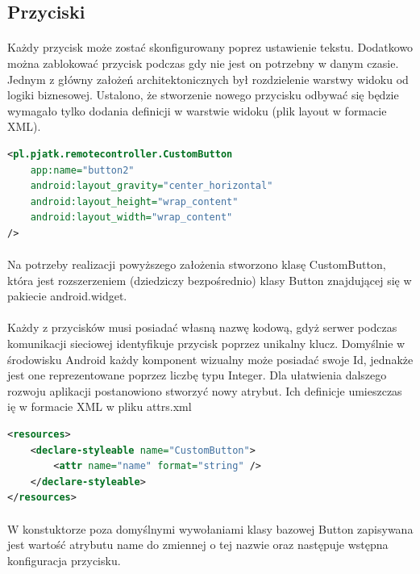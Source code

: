 \subsection{Przyciski}
\paragraph{}
Każdy przycisk może zostać skonfigurowany poprez ustawienie tekstu. Dodatkowo można zablokować przycisk podczas gdy nie jest on potrzebny w danym czasie. 
Jednym z główny założeń architektonicznych był rozdzielenie warstwy widoku od logiki biznesowej. Ustalono, że stworzenie nowego przycisku odbywać się będzie wymagało tylko dodania definicji w warstwie widoku (plik layout w formacie XML).

\begin{lstlisting}[language=XML]
<pl.pjatk.remotecontroller.CustomButton
    app:name="button2"
    android:layout_gravity="center_horizontal"
    android:layout_height="wrap_content"
    android:layout_width="wrap_content"
/>
\end{lstlisting}
\paragraph{}
Na potrzeby realizacji powyższego założenia stworzono klasę CustomButton, która jest rozszerzeniem (dziedziczy bezpośrednio) klasy Button znajdującej się w pakiecie  android.widget.
\paragraph{}
Każdy z przycisków musi posiadać własną nazwę kodową, gdyż serwer podczas komunikacji sieciowej identyfikuje przycisk poprzez unikalny klucz. Domyślnie w środowisku Android każdy komponent wizualny może posiadać swoje Id, jednakże jest one reprezentowane poprzez liczbę typu Integer.
Dla ułatwienia dalszego rozwoju aplikacji postanowiono stworzyć nowy atrybut. Ich definicje umieszczas ię w formacie XML w pliku attrs.xml

\begin{lstlisting}[language=XML]
<resources>
    <declare-styleable name="CustomButton">
        <attr name="name" format="string" />
    </declare-styleable>
</resources>
\end{lstlisting}

\paragraph{}
W konstuktorze poza domyślnymi wywołaniami klasy bazowej Button zapisywana jest wartość atrybutu name do zmiennej o tej nazwie oraz następuje wstępna konfiguracja przycisku.

